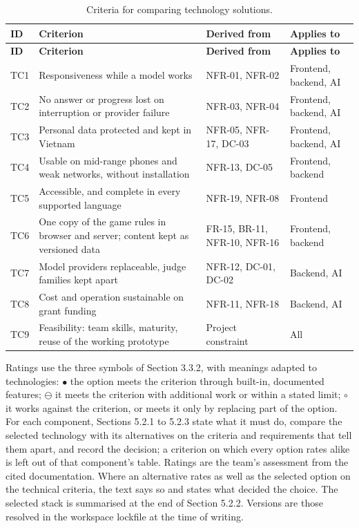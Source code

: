 {\small
\begin{longtable}{|>{\raggedright\arraybackslash}p{}|>{\raggedright\arraybackslash}p{}|>{\raggedright\arraybackslash}p{}|>{\raggedright\arraybackslash}p{}|}
\caption{Criteria for comparing technology solutions.} \\
\hline
\textbf{ID} & \textbf{Criterion} & \textbf{Derived from} & \textbf{Applies to} \\ \hline
\endfirsthead
\hline
\textbf{ID} & \textbf{Criterion} & \textbf{Derived from} & \textbf{Applies to} \\ \hline
\endhead
TC1 & Responsiveness while a model works & NFR-01, NFR-02 & Frontend, backend, AI \\ \hline
TC2 & No answer or progress lost on interruption or provider failure & NFR-03, NFR-04 & Frontend, backend, AI \\ \hline
TC3 & Personal data protected and kept in Vietnam & NFR-05, NFR-17, DC-03 & Frontend, backend, AI \\ \hline
TC4 & Usable on mid-range phones and weak networks, without installation & NFR-13, DC-05 & Frontend, backend \\ \hline
TC5 & Accessible, and complete in every supported language & NFR-19, NFR-08 & Frontend \\ \hline
TC6 & One copy of the game rules in browser and server; content kept as versioned data & FR-15, BR-11, NFR-10, NFR-16 & Frontend, backend \\ \hline
TC7 & Model providers replaceable, judge families kept apart & NFR-12, DC-01, DC-02 & Backend, AI \\ \hline
TC8 & Cost and operation sustainable on grant funding & NFR-11, NFR-18 & Backend, AI \\ \hline
TC9 & Feasibility: team skills, maturity, reuse of the working prototype & Project constraint & All \\ \hline
\end{longtable}
}

Ratings use the three symbols of Section 3.3.2, with meanings adapted to technologies: $\bullet$ the option meets the criterion through built-in, documented features; $\ominus$ it meets the criterion with additional work or within a stated limit; $\circ$ it works against the criterion, or meets it only by replacing part of the option. For each component, Sections 5.2.1 to 5.2.3 state what it must do, compare the selected technology with its alternatives on the criteria and requirements that tell them apart, and record the decision; a criterion on which every option rates alike is left out of that component's table. Ratings are the team's assessment from the cited documentation. Where an alternative rates as well as the selected option on the technical criteria, the text says so and states what decided the choice. The selected stack is summarised at the end of Section 5.2.2. Versions are those resolved in the workspace lockfile at the time of writing.

